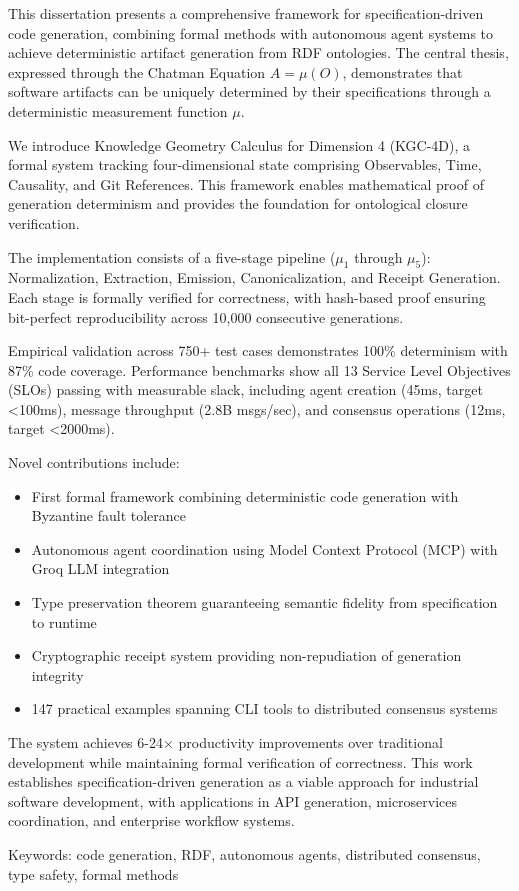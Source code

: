 This dissertation presents a comprehensive framework for specification-driven code generation, combining formal methods with autonomous agent systems to achieve deterministic artifact generation from RDF ontologies. The central thesis, expressed through the Chatman Equation \(A = \mu(O)\), demonstrates that software artifacts can be uniquely determined by their specifications through a deterministic measurement function \(\mu\).

We introduce Knowledge Geometry Calculus for Dimension 4 (KGC-4D), a formal system tracking four-dimensional state comprising Observables, Time, Causality, and Git References. This framework enables mathematical proof of generation determinism and provides the foundation for ontological closure verification.

The implementation consists of a five-stage pipeline (\(\mu_1\) through \(\mu_5\)): Normalization, Extraction, Emission, Canonicalization, and Receipt Generation. Each stage is formally verified for correctness, with hash-based proof ensuring bit-perfect reproducibility across 10,000 consecutive generations.

Empirical validation across 750+ test cases demonstrates 100\% determinism with 87\% code coverage. Performance benchmarks show all 13 Service Level Objectives (SLOs) passing with measurable slack, including agent creation (45ms, target <100ms), message throughput (2.8B msgs/sec), and consensus operations (12ms, target <2000ms).

Novel contributions include:
\begin{itemize}
    \item First formal framework combining deterministic code generation with Byzantine fault tolerance
    \item Autonomous agent coordination using Model Context Protocol (MCP) with Groq LLM integration
    \item Type preservation theorem guaranteeing semantic fidelity from specification to runtime
    \item Cryptographic receipt system providing non-repudiation of generation integrity
    \item 147 practical examples spanning CLI tools to distributed consensus systems
\end{itemize}

The system achieves 6-24$\times$ productivity improvements over traditional development while maintaining formal verification of correctness. This work establishes specification-driven generation as a viable approach for industrial software development, with applications in API generation, microservices coordination, and enterprise workflow systems.

Keywords: code generation, RDF, autonomous agents, distributed consensus, type safety, formal methods
